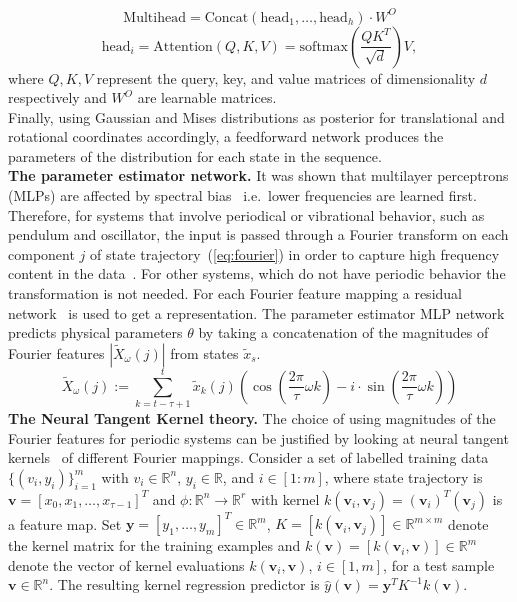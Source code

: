 \documentclass[acmtog]{techreportacmart}
\begin{document}
\begin{equation}
  \label{eq:multihead}
  \text{Multihead} = \text{Concat}(\text{head}_1, \ldots, \text{head}_h) \cdot W^{O}
\end{equation}
\begin{equation}
  \label{eq:attention}
  \text{head}_i = \text{Attention}(Q, K, V) = \text{softmax}\left(\frac{{QK^T}}{\sqrt{d}}\right)V,
\end{equation}
where ${Q, K, V}$ represent the query, key, and value matrices of dimensionality ${d}$ respectively and $W^{O}$ are learnable matrices.\\
Finally, using Gaussian and Mises distributions as posterior for translational and rotational coordinates accordingly, a feedforward network produces the parameters of the distribution for each state in the sequence.
\\
\textbf{The parameter estimator network.} It was shown that multilayer perceptrons (MLPs) are affected by spectral bias~\cite{rahamanspectral} i.e.~lower frequencies are learned first. Therefore, for systems that involve periodical or vibrational behavior, such as pendulum and oscillator, the input is passed through a Fourier transform on each component ${j}$ of state trajectory~(\ref{eq:fourier}) in order to capture high frequency content in the data~\cite{tancik2020ffn}. For other systems, which do not have periodic behavior the transformation is not needed. For each Fourier feature mapping a residual network~\cite{7780459} is used to get a representation. The parameter estimator MLP network predicts physical parameters ${\theta}$ by taking a concatenation of the magnitudes of Fourier features ${|\tilde{X}_{\omega}(j)|}$ from states $\tilde{x}_{s}$.
\begin{equation}
  \label{eq:fourier}
  \tilde{X}_{\omega}(j) := \sum_{k=t-\tau+1}^{t} \tilde{x}_k(j) \left( \cos \left(\frac{2\pi}{\tau} \omega k \right) - i \cdot \sin \left(\frac{2\pi}{\tau} \omega k \right) \right)
\end{equation}
\textbf{The Neural Tangent Kernel theory.} The choice of using magnitudes of the Fourier features for periodic systems can be justified by looking at neural tangent kernels~\cite{NEURIPS2018_5a4be1fa} of different Fourier mappings. Consider a set of labelled training data $\{(v_i, y_i)\}_{i=1}^{m}$ with $v_i \in \mathbb{R}^n$, $y_i \in \mathbb{R}$, and $i \in [1 : m]$, where state trajectory is ${\mathbf{v} = [x_0, x_1, \ldots, x_{\tau-1}]^T}$ and ${\phi: \mathbb{R}^n \rightarrow \mathbb{R}^r}$ with kernel ${k(\mathbf{v}_i, \mathbf{v}_j) = (\mathbf{v}_i)^T (\mathbf{v}_j)}$ is a feature map. Set $\mathbf{y} = [y_1, \ldots, y_m]^T \in \mathbb{R}^m$, $K = [k(\mathbf{v}_i, \mathbf{v}_j)] \in \mathbb{R}^{m \times m}$ denote the kernel matrix for the training examples and $k(\mathbf{v}) = [k(\mathbf{v}_i, \mathbf{v})] \in \mathbb{R}^{m}$ denote the vector of kernel evaluations $k(\mathbf{v}_i, \mathbf{v})$, $i \in [1, m]$, for a test sample $\mathbf{v} \in \mathbb{R}^n$. The resulting kernel regression predictor is $\hat{y}(\mathbf{v}) = \mathbf{y}^T K^{-1} k(\mathbf{v})$.
\end{document}
